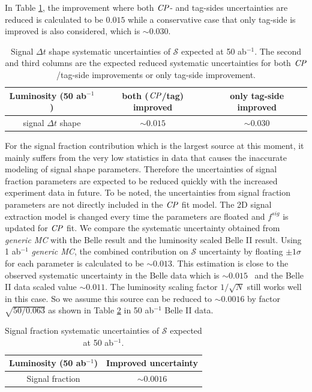 In Table  \ref{tab:sig_shape}, the improvement where both $\it{CP}$- and tag-sides uncertainties are reduced is calculated to be $0.015$ while a conservative case that only tag-side is improved is also considered, which is $\sim0.030$.
\begin{table}[H]
		\centering
		\caption{ Signal $\Delta t$ shape systematic uncertainties of $\mathcal{S}$ expected at 50 ab$^{-1}$. The second and third columns are the expected reduced systematic uncertainties for both $\it{CP}$/tag-side improvements or only tag-side improvement.}
		\label{tab:sig_shape}
		\begin{tabular}{c| c| c }
			\hline
			Luminosity (50 ab$^{-1}$) & both ($\it{CP}$/tag) improved & only tag-side improved \\
			\hline
			signal $\Delta t$ shape &  $\sim0.015$ & $\sim0.030$\\
			\hline
		\end{tabular}
\end{table}
For the signal fraction contribution which is the largest source at this moment, it mainly suffers from the very low statistics in data that causes the inaccurate modeling of signal shape parameters. Therefore the uncertainties of signal fraction parameters are expected to be reduced quickly with the increased experiment data in future. To be noted, the uncertainties from signal fraction parameters are not directly included in the $\it{CP}$ fit model. The 2D signal extraction model is changed every time the parameters are floated and $f^{sig}$ is updated for $\it{CP}$ fit. We compare the systematic uncertainty obtained from \textit{generic MC} with the Belle result and the luminosity scaled Belle II result.
 Using 1 ab$^{-1}$ \textit{generic MC}, the combined contribution on $\mathcal{S}$ uncertainty by floating $\pm 1 \sigma$ for each parameter is calculated to be $\sim 0.013$. This estimation is close to the observed systematic uncertainty in the Belle data which is  $\sim0.015$~\cite{kang2020measurement} and the Belle II data scaled value $\sim 0.011$. The luminosity scaling factor $1/\sqrt{N}$ still works well in this case. So we assume this source can be reduced to $\sim 0.0016$ by factor $\sqrt{50/0.063}$ as shown in Table \ref{tab:sig_f} in 50 ab$^{-1}$ Belle II data.

\begin{table}[htpb]
	\centering
	\caption{ Signal fraction systematic uncertainties of $\mathcal{S}$ expected at 50 ab$^{-1}$.}
	\label{tab:sig_f}
	\begin{tabular}{c| c}
		\hline
		Luminosity (50 ab$^{-1}$) & Improved uncertainty \\
		\hline
		Signal fraction &  $\sim0.0016$ \\
		\hline
	\end{tabular}
\end{table}

